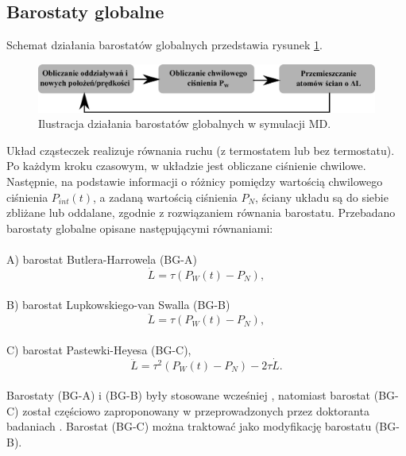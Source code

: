 \documentclass[12pt,a4paper,openright]{report} %
\begin{document}
\subsection{Barostaty globalne}
\label{barostaty_globalne}
Schemat działania barostatów globalnych przedstawia rysunek \ref{BG-schemat}.
%
\begin{figure}[h]
\centering
\includegraphics[width=160mm]{rysunki/BG-schemat.pdf}
\caption{Ilustracja działania barostatów globalnych w symulacji MD.}
\label{BG-schemat}
\end{figure}
%
%
%
%
%
%
Układ cząsteczek realizuje równania ruchu (z termostatem lub bez termostatu). Po każdym kroku czasowym, w układzie jest obliczane ciśnienie chwilowe. Następnie, na podstawie informacji o różnicy pomiędzy wartością chwilowego ciśnienia $P_{int}(t)$, a zadaną wartością ciśnienia $P_N$, ściany układu są do siebie zbliżane lub oddalane, zgodnie z rozwiązaniem równania barostatu. Przebadano barostaty globalne opisane następującymi równaniami: \\
\\
A) barostat Butlera-Harrowela (BG-A)\cite{ButlerHarrowell2003}\\
\begin{equation}
\dot{L}= \tau (P_W(t)-P_N),
\label{BGA}
\end{equation}
\\
B) barostat Lupkowskiego-van Swalla (BG-B)\cite{LupowskivanSwoll91a, LupowskivanSwoll91b}\\
\begin{equation}
\ddot{L}= \tau (P_W(t)-P_N),
\label{BGB}
\end{equation}
\\
C) barostat Pastewki-Heyesa (BG-C)\cite{Pastewka2010, Gattinoni2014},\\
\begin{equation}
\ddot{L}= \tau^2 (P_W(t)-P_N) -2 \tau \dot{L}.
\label{BGC}
\end{equation}
\\
Barostaty (BG-A) i (BG-B) były stosowane wcześniej \cite{LupowskivanSwoll91a, LupowskivanSwoll91b, ButlerHarrowell2003, DMH1, Gattinoni2013}, natomiast barostat (BG-C) został częściowo zaproponowany w przeprowadzonych przez doktoranta badaniach \cite{Gattinoni2014}. 
Barostat (BG-C) można traktować jako modyfikację barostatu (BG-B).
\end{document}
